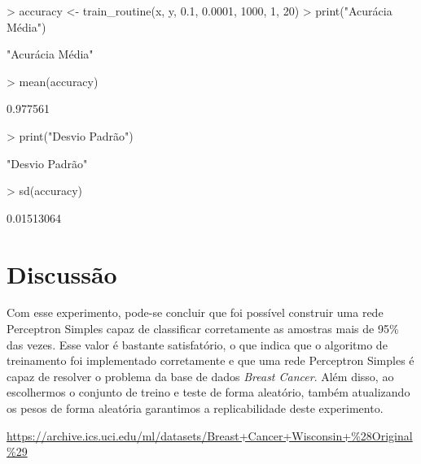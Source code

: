 \documentclass[12pt]{article}
\begin{document}
\begin{Schunk}
\begin{Sinput}
> accuracy <- train_routine(x, y, 0.1, 0.0001, 1000, 1, 20)
> print("Acurácia Média")
\end{Sinput}
\begin{Soutput}
[1] "Acurácia Média"
\end{Soutput}
\begin{Sinput}
> mean(accuracy)
\end{Sinput}
\begin{Soutput}
[1] 0.977561
\end{Soutput}
\begin{Sinput}
> print("Desvio Padrão")
\end{Sinput}
\begin{Soutput}
[1] "Desvio Padrão"
\end{Soutput}
\begin{Sinput}
> sd(accuracy)
\end{Sinput}
\begin{Soutput}
[1] 0.01513064
\end{Soutput}
\end{Schunk}

\section{Discussão}

  \par Com esse experimento, pode-se concluir que foi possível construir uma rede Perceptron Simples capaz de classificar corretamente as amostras mais de 95\% das vezes. Esse valor é bastante satisfatório, o que indica que o algoritmo de treinamento foi implementado corretamente e que uma rede Perceptron Simples é capaz de resolver o problema da base de dados \textit{Breast Cancer}. Além disso, ao escolhermos o conjunto de treino e teste  de forma aleatório, também atualizando os pesos de forma aleatória garantimos a replicabilidade deste experimento. 



\begin{thebibliography}{99}
		\label{BreastCancer} \url{https://archive.ics.uci.edu/ml/datasets/Breast+Cancer+Wisconsin+\%28Original\%29}
\end{thebibliography}	
\end{document}
